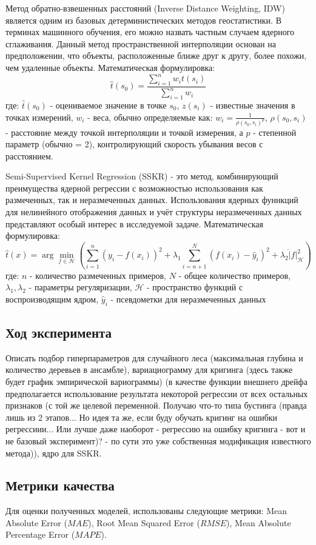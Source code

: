 \documentclass{article}
\begin{document}
Метод обратно-взвешенных расстояний (Inverse Distance Weighting, IDW) является одним из базовых детерминистических методов геостатистики. В терминах машинного обучения, его можно назвать частным случаем ядерного сглаживания. Данный метод пространственной интерполяции основан на предположении, что объекты, расположенные ближе друг к другу, более похожи, чем удаленные объекты.
Математическая формулировка:
$$\hat{t}(s_0) = \frac{\sum_{i=1}^n w_i t(s_i)}{\sum_{i=1}^n w_i}$$
где: $\hat{t}(s_0)$ - оцениваемое значение в точке $s_0$, $z(s_i)$ - известные значения в точках измерений, $w_i$ - веса, обычно определяемые как: $w_i = \frac{1}{\rho(s_0, s_i)^p}$, $\rho(s_0, s_i)$ - расстояние между точкой интерполяции и точкой измерения, а $p$ - степенной параметр (обычно = 2), контролирующий скорость убывания весов с расстоянием. 

Semi-Supervised Kernel Regression (SSKR) - это метод, комбинирующий преимущества ядерной регрессии с возможностью использования как размеченных, так и неразмеченных данных. Использования ядерных фуннкций для нелинейного отображения данных и учёт структуры неразмеченных данных представляют особый интерес в исследуемой задаче.
Математическая формулировка:
$$\hat{t}(x) = \arg\min_{f \in \mathcal{H}} \left( \sum_{i=1}^n (y_i - f(x_i))^2 + \lambda_1 \sum_{i=n+1}^{N} (f(x_i) - \hat{y}_i)^2 + \lambda_2 \dot |f|^2_{\mathcal{H}} \right)$$
где: $n$ - количество размеченных примеров, $N$ - общее количество примеров, $\lambda_1, \lambda_2$ - параметры регуляризации, $\mathcal{H}$ - пространство функций с воспроизводящим ядром,
$\hat{y}_i$ - псевдометки для неразмеченных данных


\subsection{Ход эксперимента}
Описать подбор гиперпараметров для случайного леса (максимальная глубина и количество деревьев в ансамбле), вариациограмму для кригинга (здесь также будет график эмпирической вариограммы) (в качестве функции внешнего дрейфа предполагается использование результата некоторой регрессии от всех остальных признаков (с той же целевой переменной. Получаю что-то типа бустинга (правда лишь из 2 этапов... Но идея та же, если буду обучать кригинг на ошибки регрессиии... Или лучше даже наоборот - регрессию на ошибку кригинга - вот и не базовый эксперимент)? - по сути это уже собственная модификация известного метода)), ядро для SSKR.

\subsection{Метрики качества}
Для оценки полученных моделей, использованы следующие метрики: Mean Absolute Error ($MAE$), Root Mean Squared Error ($RMSE$), Mean Absolute Percentage Error ($MAPE$).
\end{document}
